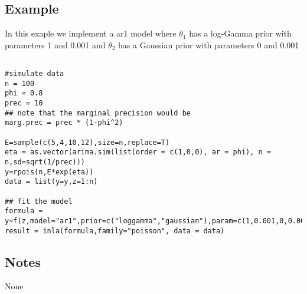 \documentclass[a4paper,11pt]{article}
\begin{document}
\subsection*{Example}

In this exaple we implement a ar1 model where $\theta_1$ has a log-Gamma prior with parameters 1 and 0.001 and $\theta_2$ has a Gaussian prior with parameters 0 and 0.001
\begin{verbatim}

#simulate data
n = 100
phi = 0.8
prec = 10
## note that the marginal precision would be
marg.prec = prec * (1-phi^2)

E=sample(c(5,4,10,12),size=n,replace=T)
eta = as.vector(arima.sim(list(order = c(1,0,0), ar = phi), n = n,sd=sqrt(1/prec)))
y=rpois(n,E*exp(eta))
data = list(y=y,z=1:n)

## fit the model
formula = y~f(z,model="ar1",prior=c("loggamma","gaussian"),param=c(1,0.001,0,0.001))
result = inla(formula,family="poisson", data = data)
\end{verbatim}


\subsection*{Notes}

None
\end{document}

